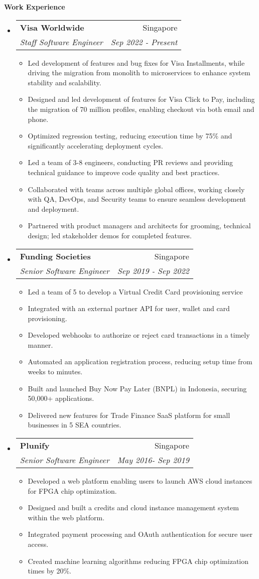 \documentclass[letterpaper,11pt]{article}
\makeatletter
\newcommand{\resitem}[1]{\item #1 \vspace{-2pt}}
\newcommand{\resheading}[1]{{\large \colorbox{mygrey}{\begin{minipage}{\textwidth}{\textbf{#1 \vphantom{p\^{E}}}}\end{minipage}}}}
\newcommand{\ressubheading}[4]{
\begin{tabular*}{7.0in}{l@{\extracolsep{\fill}}r}
		\textbf{#1} & #2 \\
		\textit{#3} & \textit{#4} \\
\end{tabular*}\vspace{-6pt}}
\makeatother
\begin{document}
\resheading{Work Experience}
\begin{itemize}

\item
	\ressubheading{Visa Worldwide}{Singapore}{Staff Software Engineer}{Sep 2022 - Present}

	\begin{itemize}
		\resitem{Led development of features and bug fixes for Visa Installments, while driving the migration from monolith to microservices to enhance system stability and scalability.}
		\resitem{Designed and led development of features for Visa Click to Pay, including the migration of 70 million profiles, enabling checkout via both email and phone.}
		\resitem{Optimized regression testing, reducing execution time by 75\% and significantly accelerating deployment cycles.}
		\resitem{Led a team of 3-8 engineers, conducting PR reviews and providing technical guidance to improve code quality and best practices.}
		\resitem{Collaborated with teams across multiple global offices, working closely with QA, DevOps, and Security teams to ensure seamless development and deployment.}
		\resitem{Partnered with product managers and architects for grooming, technical design; led stakeholder demos for completed features.}
	\end{itemize}
	
\item
	\ressubheading{Funding Societies}{Singapore}{Senior Software Engineer}{Sep 2019 - Sep 2022}

	\begin{itemize}
		\resitem{Led a team of 5 to develop a Virtual Credit Card provisioning service}
		\resitem{Integrated with an external partner API for user,  wallet and card provisioning.}
		\resitem{Developed webhooks to authorize or reject card transactions in a timely manner.}
		\resitem{Automated an application registration process,  reducing setup time from weeks to minutes.}
		\resitem{Built and launched Buy Now Pay Later (BNPL) in Indonesia, securing 50,000+ applications.}
		\resitem{Delivered new features for Trade Finance SaaS platform for small businesses in 5 SEA countries.}
	\end{itemize}


\item
	\ressubheading{Plunify}{Singapore}{Senior Software Engineer}{May 2016- Sep 2019}
	\begin{itemize}
	    \resitem{Developed a web platform enabling users to launch AWS cloud instances for FPGA chip optimization.}
	    \resitem{Designed and built a credits and cloud instance management system within the web platform.}
	    \resitem{Integrated payment processing and OAuth authentication for secure user access.}
	   \resitem{Created machine learning algorithms reducing FPGA chip optimization times by 20\%.}
	\end{itemize}



\end{itemize}
\end{document}
